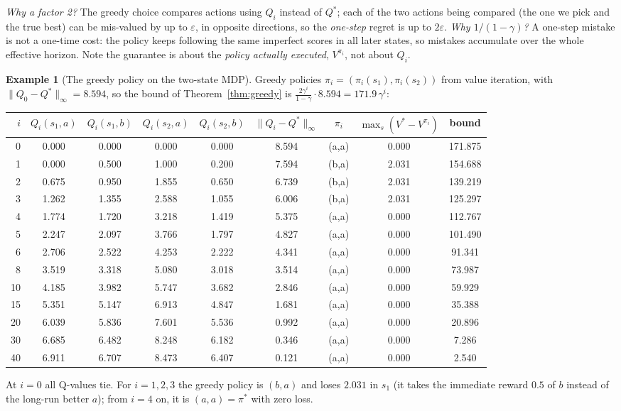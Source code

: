 \documentclass[11pt,a4paper]{article}
\newcommand{\norm}[1]{\lVert #1\rVert_\infty}
\theoremstyle{plain}
\theoremstyle{definition}
\newtheorem{example}{Example}\renewcommand{\theexample}{E\arabic{example}}
\theoremstyle{remark}
\begin{document}
\begin{intuition}
\emph{Why a factor 2?} The greedy choice compares actions using $Q_i$ instead of $Q^*$; each of the two actions being compared (the one we pick and the true best) can be mis-valued by up to $\varepsilon$, in opposite directions, so the \emph{one-step} regret is up to $2\varepsilon$. \emph{Why $1/(1-\gamma)$?} A one-step mistake is not a one-time cost: the policy keeps following the same imperfect scores in all later states, so mistakes accumulate over the whole effective horizon. Note the guarantee is about the \emph{policy actually executed}, $V^{\pi_i}$, not about $Q_i$.
\end{intuition}

\begin{example}[The greedy policy on the two-state MDP]\label{ex:greedy}
Greedy policies $\pi_i=(\pi_i(s_1),\pi_i(s_2))$ from value iteration, with $\norm{Q_0-Q^*}=8.594$, so the bound of Theorem~\ref{thm:greedy} is $\tfrac{2\gamma^i}{1-\gamma}\cdot8.594=171.9\,\gamma^i$:
\begin{center}
\small
\begin{tabular}{@{}rcccccccc@{}}
\toprule
$i$ & $Q_i(s_1,a)$ & $Q_i(s_1,b)$ & $Q_i(s_2,a)$ & $Q_i(s_2,b)$ & $\norm{Q_i-Q^*}$ & $\pi_i$ & $\max_s(V^*-V^{\pi_i})$ & bound\\
\midrule
0 & 0.000 & 0.000 & 0.000 & 0.000 & 8.594 & (a,a) & 0.000 & 171.875 \\
1 & 0.000 & 0.500 & 1.000 & 0.200 & 7.594 & (b,a) & 2.031 & 154.688 \\
2 & 0.675 & 0.950 & 1.855 & 0.650 & 6.739 & (b,a) & 2.031 & 139.219 \\
3 & 1.262 & 1.355 & 2.588 & 1.055 & 6.006 & (b,a) & 2.031 & 125.297 \\
4 & 1.774 & 1.720 & 3.218 & 1.419 & 5.375 & (a,a) & 0.000 & 112.767 \\
5 & 2.247 & 2.097 & 3.766 & 1.797 & 4.827 & (a,a) & 0.000 & 101.490 \\
6 & 2.706 & 2.522 & 4.253 & 2.222 & 4.341 & (a,a) & 0.000 & 91.341 \\
8 & 3.519 & 3.318 & 5.080 & 3.018 & 3.514 & (a,a) & 0.000 & 73.987 \\
10 & 4.185 & 3.982 & 5.747 & 3.682 & 2.846 & (a,a) & 0.000 & 59.929 \\
15 & 5.351 & 5.147 & 6.913 & 4.847 & 1.681 & (a,a) & 0.000 & 35.388 \\
20 & 6.039 & 5.836 & 7.601 & 5.536 & 0.992 & (a,a) & 0.000 & 20.896 \\
30 & 6.685 & 6.482 & 8.248 & 6.182 & 0.346 & (a,a) & 0.000 & 7.286 \\
40 & 6.911 & 6.707 & 8.473 & 6.407 & 0.121 & (a,a) & 0.000 & 2.540 \\
\bottomrule
\end{tabular}
\end{center}
At $i=0$ all Q-values tie. For $i=1,2,3$ the greedy policy is $(b,a)$ and loses $2.031$ in $s_1$ (it takes the immediate reward $0.5$ of $b$ instead of the long-run better $a$); from $i=4$ on, it is $(a,a)=\pi^*$ with zero loss.
\end{example}
\end{document}
